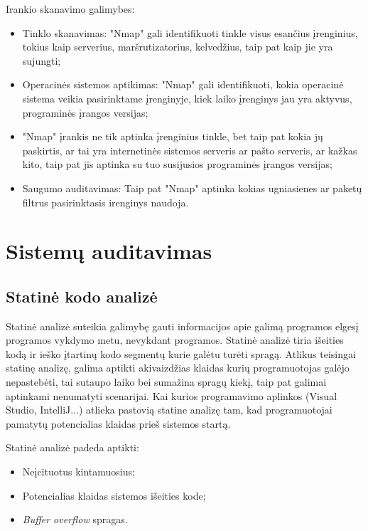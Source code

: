 \documentclass[a4paper,12pt,fleqn]{article}
\begin{document}
Irankio skanavimo galimybes:
\begin{itemize}
	\item Tinklo skanavimas: "Nmap" gali identifikuoti tinkle visus esančius įrenginius, tokius kaip serverius, maršrutizatorius, kelvedžius, taip pat kaip jie yra sujungti;
	\item Operacinės sistemos aptikimas: "Nmap" gali identifikuoti, kokia operacinė sistema veikia pasirinktame įrenginyje, kiek laiko įrenginys jau yra aktyvus, programinės įrangos versijas;
	\item "Nmap" įrankis ne tik aptinka įrenginius tinkle, bet taip pat kokia jų paskirtis, ar tai yra internetinės sistemos serveris ar pašto serveris, ar kažkas kito, taip pat jis aptinka su tuo susijusios programinės įrangos versijas;
	\item Saugumo auditavimas: Taip pat "Nmap" aptinka kokias ugniasienes ar paketų filtrus pasirinktasis irenginys naudoja.
\end{itemize}

\newpage
\section{Sistemų auditavimas}
\label{sec:motivation}

\subsection{Statinė kodo analizė}
\label{sec:example}

\label{sec:data}
Statinė analizė suteikia galimybę gauti informacijos apie galimą programos elgesį programos vykdymo metu, nevykdant programos. Statinė analizė tiria išeities kodą ir ieško įtartinų kodo segmentų kurie galėtu turėti spragą. Atlikus teisingai statinę analizę, galima aptikti akivaizdžias klaidas kurių programuotojas galėjo nepastebėti, tai sutaupo laiko bei sumažina spragų kiekį, taip pat galimai aptinkami nenumatyti scenarijai\cite{Cowan:2003:SSO:858866.859050}. Kai kurios programavimo aplinkos (Visual Studio, IntelliJ...) atlieka pastovią statine analizę tam, kad programuotojai pamatytų potencialias klaidas prieš sistemos startą. 

Statinė analizė padeda aptikti:
\begin{itemize}
	\item Neįcituotus kintamuosius;
	\item Potencialias klaidas sistemos išeities kode;
	\item \textit{Buf{}fer overflow} spragas.
\end{itemize}
\end{document}
